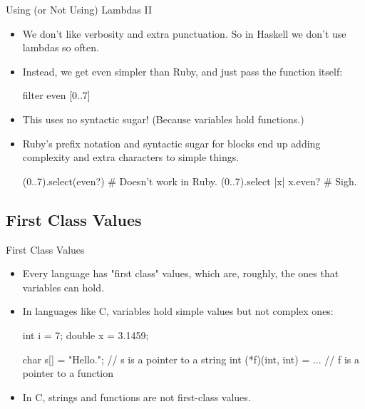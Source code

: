 \documentclass[xcolor=dvipsnames]{beamer}          %
\begin{document}
\begin{frame}[fragile]{Using (or Not Using) Lambdas II}
\begin{itemize}
    \item We don't like verbosity and extra punctuation.
        So in Haskell we don't use lambdas so often.
    \item Instead, we get even simpler than Ruby, and just pass the
        function itself:
        \begin{hlisting}
            filter even [0..7]
        \end{hlisting}
    \item This uses no syntactic sugar! (Because variables hold functions.)
    \item Ruby's prefix notation and syntactic sugar for blocks end up
        adding complexity and extra characters to simple things.
        \begin{rlisting}
            (0..7).select(even?)           # Doesn't work in Ruby.
            (0..7).select { |x| x.even? }  # Sigh.
        \end{rlisting}
\end{itemize}
\end{frame}


\subsection{First Class Values}

\begin{frame}[fragile]{First Class Values}
\begin{itemize}
    \item Every language has "first class" values, which are, roughly,
        the ones that variables can hold.
    \item In languages like C, variables hold simple values but not
        complex ones:
        \begin{olisting}
            int i = 7;
            double x = 3.1459;

            char s[] = "Hello.";     // s is a pointer to a string
            int (*f)(int, int) = ... // f is a pointer to a function
        \end{olisting}
    \item In C, strings and functions are not first-class values.
\end{itemize}
\end{frame}
\end{document}
